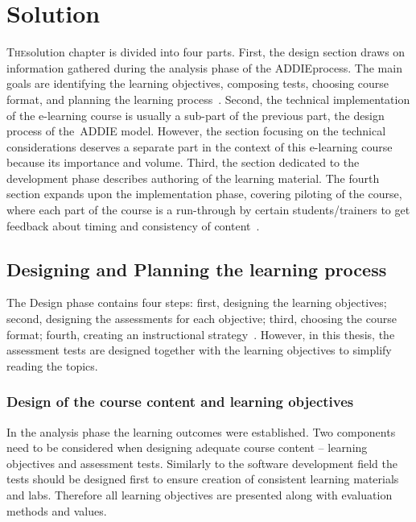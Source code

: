 \chapter{Solution}
\label{solution}
\lettrine[lraise=0.1, nindent=0em, slope=-.5em]{\color{Violet}T}{he}solution chapter is divided into four parts. First, the design section draws on information gathered during the analysis phase of the  \gls{ADDIE}process. The main goals are identifying the learning objectives, composing tests, choosing course format, and planning the learning process~\citep{website:design_phase_ADDIE}.  Second, the technical implementation of the e-learning course is usually a sub-part of the previous part, the design process of the~\gls{ADDIE}  model. However, the section focusing on the technical considerations deserves a separate part in the context of this e-learning course because its importance and  volume. Third, the section dedicated to the development phase describes authoring of the learning material. The fourth section expands upon the implementation phase, covering piloting of the course, where each part of the course is a run-through by certain students/trainers to get feedback about timing and consistency of content~\citep{website:design_phase_ADDIE}.



 
\section{Designing and Planning the learning process}
The Design phase contains four steps: first, designing the learning objectives; second, designing the assessments for each objective; third, choosing the course format; fourth, creating an instructional strategy~\citep{website:design_phase_ADDIE}.  However, in this thesis, the assessment tests are designed together with the learning objectives to simplify reading the topics.

\subsection{Design of the course content and learning objectives}

In the analysis phase the learning outcomes were established. Two components need to be considered when designing adequate course content -- learning objectives and assessment tests. Similarly to the software development field the tests should be designed first to ensure creation of consistent learning materials and labs. Therefore all learning objectives are presented along with evaluation methods and values.

